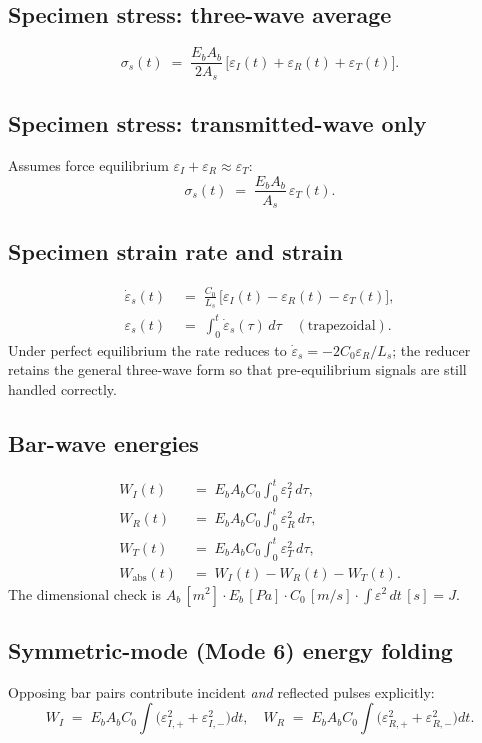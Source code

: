 \documentclass[11pt,a4paper,openany]{book}
\theoremstyle{handbook}
\newcommand{\sig}{\sigma}
\newcommand{\eps}{\varepsilon}
\newcommand{\epsdot}{\dot\eps}
\newcommand{\Cz}{C_0}
\newcommand{\Ab}{A_b}
\newcommand{\As}{A_s}
\newcommand{\Ls}{L_s}
\begin{document}
\subsection*{Specimen stress: three-wave average}
\begin{equation}
  \sig_s(t) \;=\; \frac{E_b\Ab}{2\As}\,\bigl[\eps_I(t)+\eps_R(t)+\eps_T(t)\bigr].
  \label{eq:red-3wave}
\end{equation}

\subsection*{Specimen stress: transmitted-wave only}
Assumes force equilibrium $\eps_I+\eps_R\approx\eps_T$:
\begin{equation}
  \sig_s(t) \;=\; \frac{E_b\Ab}{\As}\,\eps_T(t).
  \label{eq:red-1wave}
\end{equation}

\subsection*{Specimen strain rate and strain}
\begin{align}
  \epsdot_s(t) &\;=\; \frac{\Cz}{\Ls}\,\bigl[\eps_I(t)-\eps_R(t)-\eps_T(t)\bigr],\\
  \eps_s(t) &\;=\; \int_{0}^{t}\!\epsdot_s(\tau)\,d\tau \quad (\text{trapezoidal}).
\end{align}
Under perfect equilibrium the rate reduces to $\epsdot_s=-2\Cz\eps_R/\Ls$;
the reducer retains the general three-wave form so that pre-equilibrium
signals are still handled correctly.

\subsection*{Bar-wave energies}
\begin{align}
  W_I(t) &\;=\; E_b\Ab\Cz\!\int_{0}^{t}\!\eps_I^{2}\,d\tau, \\
  W_R(t) &\;=\; E_b\Ab\Cz\!\int_{0}^{t}\!\eps_R^{2}\,d\tau, \\
  W_T(t) &\;=\; E_b\Ab\Cz\!\int_{0}^{t}\!\eps_T^{2}\,d\tau, \\
  W_{\text{abs}}(t) &\;=\; W_I(t) - W_R(t) - W_T(t).
\end{align}
The dimensional check is
$\Ab\,[\si{m^{2}}]\cdot E_b\,[\si{Pa}]\cdot \Cz\,[\si{m/s}]
\cdot\int\eps^{2}\,dt\,[\si{s}] = \si{J}$.

\subsection*{Symmetric-mode (Mode 6) energy folding}
Opposing bar pairs contribute incident \emph{and} reflected pulses
explicitly:
\begin{equation}
  W_I \;=\; E_b\Ab\Cz\!\int\bigl(\eps_{I,+}^{2}+\eps_{I,-}^{2}\bigr)dt,
  \quad
  W_R \;=\; E_b\Ab\Cz\!\int\bigl(\eps_{R,+}^{2}+\eps_{R,-}^{2}\bigr)dt.
\end{equation}
\end{document}

